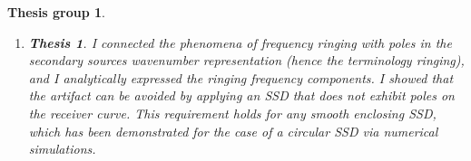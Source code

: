 \documentclass[10pt,twoside]{article}
\theoremstyle{thesisgroupstyle}
\newtheorem{thesisgroup}{Thesis group}
\newtheorem{thesis}{Thesis}[thesisgroup]
\begin{document}
\begin{thesisgroup}
\begin{enumerate}
	\item[] \vspace{-7mm}\begin{thesis} I connected the phenomena of frequency ringing with poles in the secondary sources wavenumber representation (hence the terminology \emph{ringing}), and I analytically expressed the ringing frequency components.
	I showed that the artifact can be avoided by applying an SSD that does not exhibit poles on the receiver curve.
	This requirement holds for any smooth enclosing SSD, which has been demonstrated for the case of a circular SSD via numerical simulations.\end{thesis}
\end{enumerate} 
\end{thesisgroup}

\printbibliography[title={Journal papers}, category=journal, prefixnumbers={J}, heading=subbibliography,resetnumbers=true]
\printbibliography[title={Conference papers}, category=conference, prefixnumbers={C}, heading=subbibliography, resetnumbers=true]
\printbibliography[title={Other publications}, category=other, prefixnumbers={O}, heading=subbibliography, resetnumbers=true]
\end{document}
